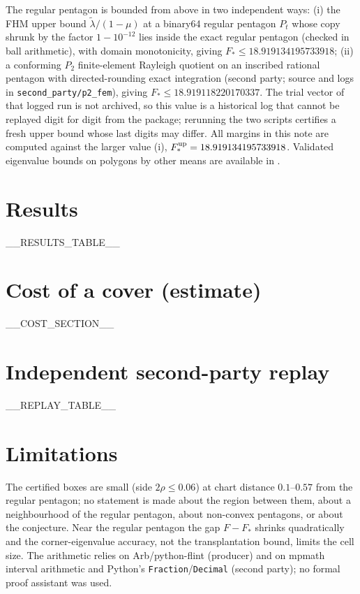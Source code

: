 \documentclass[11pt]{article}
\theoremstyle{remark}
\begin{document}
The regular pentagon is bounded from above in two independent ways:
(i) the FHM upper bound $\tilde\lambda/(1-\mu)$ at a binary64 regular pentagon $P_t$ whose copy shrunk by the factor
$1-10^{-12}$ lies inside the exact regular pentagon (checked in ball arithmetic), with domain monotonicity, giving
$F_*\le 18.919134195733918$; (ii) a conforming $P_2$ finite-element Rayleigh quotient on an inscribed rational
pentagon with directed-rounding exact integration (second party; source and logs in \texttt{second\_party/p2\_fem}),
giving $F_*\le 18.919118220170337$. The trial vector of that logged run is not archived, so this value is a
historical log that cannot be replayed digit for digit from the package; rerunning the two scripts certifies a fresh
upper bound whose last digits may differ. All margins in this note are computed against the larger value (i),
$F_*^{\rm up}=18.919134195733918$. Validated eigenvalue bounds on polygons by other means are available in \cite{lo}.

\section{Results}\label{sec:results}
__RESULTS_TABLE__

\section{Cost of a cover (estimate)}\label{sec:cost}
__COST_SECTION__

\section{Independent second-party replay}\label{sec:replay}
__REPLAY_TABLE__

\section{Limitations}
The certified boxes are small (side $2\rho\le0.06$) at chart distance $0.1$--$0.57$ from the regular pentagon; no statement is made about the region between them,
about a neighbourhood of the regular pentagon, about non-convex pentagons, or about the conjecture. Near the regular
pentagon the gap $F-F_*$ shrinks quadratically and the corner-eigenvalue accuracy, not the transplantation bound,
limits the cell size. The arithmetic relies on Arb/python-flint \cite{arb} (producer) and on mpmath interval arithmetic
and Python's \texttt{Fraction}/\texttt{Decimal} (second party); no formal proof assistant was used.
\end{document}
